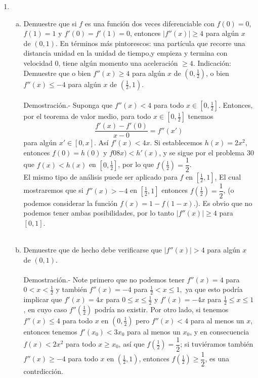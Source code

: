 \begin{enumerate}[\bfseries 1.]
\begin{enumerate}[(a)]
	\end{enumerate}

    \item 
	\begin{enumerate}[(a)]

	    \item Demuestre que si $f$ es una función dos veces diferenciable con $f(0)=0$, $f(1)=1$ y $f'(0)=f'(1)=0$, entonces $|f''(x)|\geq 4$ para algún $x$ de $(0,1)$. En términos más pintorescos: una partícula que recorre una distancia unidad en la unidad de tiempo,y empieza y termina con velocidad $0$, tiene algún momento una aceleración $\geq 4$. Indicación: Demuestre que o bien $f''(x)\geq 4$ para algún $x$ de $\left(0,\frac{1}{2}\right)$, o bien $f''(x)\leq -4$ para algún $x$ de $\left(\frac{1}{2},1\right)$.\\\\
		Demostración.-\; Suponga que $f''(x)<4$ para todo $x\in [0,\frac{1}{2}]$. Entonces, por el teorema de valor medio, para todo $x\in [0,\frac{1}{2}]$ tenemos
		$$\dfrac{f'(x)-f'(0)}{x-0}=f''\left(x'\right)$$
		para algún $x'\in [0,x]$. Así $f'(x)<4x$. Si establecemos $h(x)=2x^2,$ entonces $f(0)=h(0)$ y $f08x)<h'(x)$, y se sigue por el problema 30 que $f(x)<h(x)$ en $[0,\frac{1}{2}]$, por lo que $f(\frac{1}{2})=\dfrac{1}{2}$.\\
		El mismo tipo de análisis puede ser aplicado para $f$ en $[\frac{1}{2},1]$, El cual mostraremos que si $f''(x)>-4$ en $[\frac{1}{2},1]$ entonces $f(\frac{1}{2})=\dfrac{1}{2}$, (o podemos considerar la función $f(x)=1-f(1-x).$). Es obvio que no podemos tener ambas posibilidades, por lo tanto $|f''(x)|\geq 4$ para $[0,1]$.\\\\

	    \item Demuestre que de hecho debe verificarse que $|f''(x)|>4$ para algún $x$ de $(0,1)$.\\\\
		Demostración.-\; Note primero que no podemos tener $f''(x)=4$ para $0<x<\frac{1}{2}$ y también $f''(x)=-4$ para $\frac{1}{2}<x\leq 1,$ ya que esto podría implicar que $f'(x)=4x$ para $0\leq x \leq \frac{1}{2}$ y $f'(x)=-4x$ para $\frac{1}{2}\leq x\leq 1$, en cuyo caso $f''(\frac{1}{2})$ podría no existir. Por otro lado, si tenemos $f''(x)\leq 4$ para todo $x$ en $(0,\frac{1}{2})$ pero $f''(x)<4$ para al menos un $x$, entonces tenemos $f'(x_0)<3x_0$ para al menos un $x_0$, y en consecuencia $f(x)<2x^2$ para todo $x\geq x_0$, así que $f(\frac{1}{2})=\dfrac{1}{2}$; si tuviéramos también $f''(x)\geq -4$ para todo $x$ en $(\frac{1}{2},1)$, entonces $f(\frac{1}{2})\geq \dfrac{1}{2}$, es una contrdicción.\\\\


\end{enumerate}
\end{enumerate}
